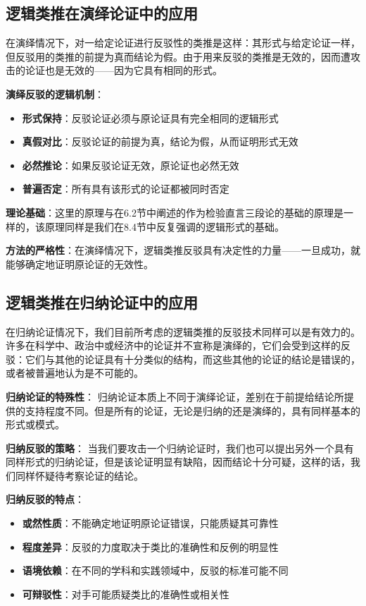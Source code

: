 \subsection{逻辑类推在演绎论证中的应用}

\begin{theorembox}[title=演绎论证中的逻辑类推反驳]
在演绎情况下，对一给定论证进行反驳性的类推是这样：其形式与给定论证一样，但反驳用的类推的前提为真而结论为假。由于用来反驳的类推是无效的，因而遭攻击的论证也是无效的——因为它具有相同的形式。

\textbf{演绎反驳的逻辑机制}：
\begin{itemize}
\item \textbf{形式保持}：反驳论证必须与原论证具有完全相同的逻辑形式
\item \textbf{真假对比}：反驳论证的前提为真，结论为假，从而证明形式无效
\item \textbf{必然推论}：如果反驳论证无效，原论证也必然无效
\item \textbf{普遍否定}：所有具有该形式的论证都被同时否定
\end{itemize}

\textbf{理论基础}：这里的原理与在6.2节中阐述的作为检验直言三段论的基础的原理是一样的，该原理同样是我们在8.4节中反复强调的逻辑形式的基础。

\textbf{方法的严格性}：在演绎情况下，逻辑类推反驳具有决定性的力量——一旦成功，就能够确定地证明原论证的无效性。
\end{theorembox}

\subsection{逻辑类推在归纳论证中的应用}

\begin{theorembox}[title=归纳论证中的逻辑类推反驳]
在归纳论证情况下，我们目前所考虑的逻辑类推的反驳技术同样可以是有效力的。许多在科学中、政治中或经济中的论证并不宣称是演绎的，它们会受到这样的反驳：它们与其他的论证具有十分类似的结构，而这些其他的论证的结论是错误的，或者被普遍地认为是不可能的。

\textbf{归纳论证的特殊性}：
归纳论证本质上不同于演绎论证，差别在于前提给结论所提供的支持程度不同。但是所有的论证，无论是归纳的还是演绎的，具有同样基本的形式或模式。

\textbf{归纳反驳的策略}：
当我们要攻击一个归纳论证时，我们也可以提出另外一个具有同样形式的归纳论证，但是该论证明显有缺陷，因而结论十分可疑，这样的话，我们同样怀疑待考察论证的结论。

\textbf{归纳反驳的特点}：
\begin{itemize}
\item \textbf{或然性质}：不能确定地证明原论证错误，只能质疑其可靠性
\item \textbf{程度差异}：反驳的力度取决于类比的准确性和反例的明显性
\item \textbf{语境依赖}：在不同的学科和实践领域中，反驳的标准可能不同
\item \textbf{可辩驳性}：对手可能质疑类比的准确性或相关性
\end{itemize}
\end{theorembox}

